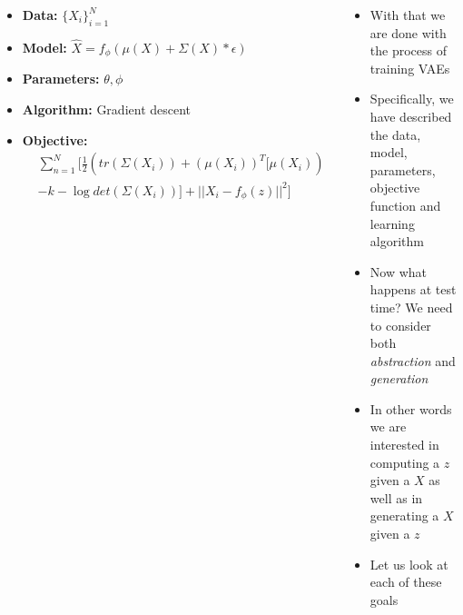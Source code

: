\begin{frame}
	\begin{columns}
		\begin{overlayarea}{\textwidth}{\textheight}
			\footnotesize{\begin{itemize}[<2->]\justifying
				\item \textbf{Data:} $\{X_i\}_{i=1}^N$
				\item \textbf{Model:} $\hat{X} = f_\phi(\mu(X) + \Sigma(X) \ast \epsilon)$
				\item \textbf{Parameters:} $\theta, \phi$
				\item \textbf{Algorithm:} Gradient descent
				\item \textbf{Objective:} 
				\begin{align*}
					& \sum_{n=1}^N \bigg[\frac{1}{2}(tr(\Sigma(X_i))+(\mu(X_i))^T[\mu(X_i))\\
					& -k-\log det(\Sigma(X_i))] + ||X_i - f_\phi(z)||^2 \bigg]
				\end{align*}
			\end{itemize}}
		\end{overlayarea}
		\begin{overlayarea}{\textwidth}{\textheight}
			\begin{itemize}[<+->]\justifying
				\item With that we are done with the process of training VAEs
				\item Specifically, we have described the data, model, parameters, objective function and learning algorithm
				\item Now what happens at test time? We need to consider both \textit{abstraction} and \textit{generation}
				\item In other words we are interested in computing a $z$ given a $X$ as well as in generating a $X$ given a $z$
				\item Let us look at each of these goals
			\end{itemize}
		\end{overlayarea}
	\end{columns}
\end{frame}

